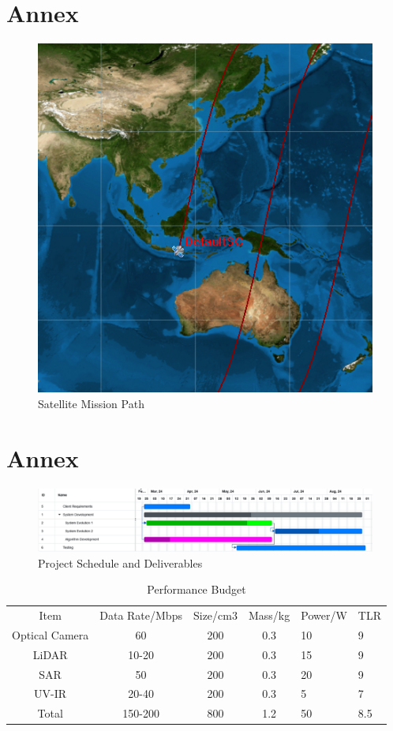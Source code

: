 \section{Annex}
\begin{figure}[h!tpb]
    \centering
    \includegraphics[width=\linewidth]{Figures/SatelliteGMAT.png}
    \caption{Satellite Mission Path}
    \label{fig:tcanther}
\end{figure}


\section{Annex}
\begin{figure}[h!tpb]
    \centering
    \includegraphics[width=\linewidth]{Figures/SatelliteSchedule.png}
    \caption{Project Schedule and Deliverables}
    \label{fig:tcanther}
\end{figure}


\begin{table}[h!]
    \centering
    \begin{tabular}{ccccll}
         Item&  Data Rate/Mbps&  Size/cm3& Mass/kg & Power/W&TLR\\
         Optical Camera&  60&  200& 0.3 & 10&9\\
         LiDAR&  10-20&  200& 0.3 & 15&9\\
         SAR&  50&  200& 0.3 & 20&9\\
         UV-IR&  20-40&  200& 0.3 & 5&7\\
 Total& 150-200& 800&1.2 & 50&8.5\\
    \end{tabular}
    \caption{Performance Budget}
    \label{tab:my_label}
\end{table}



